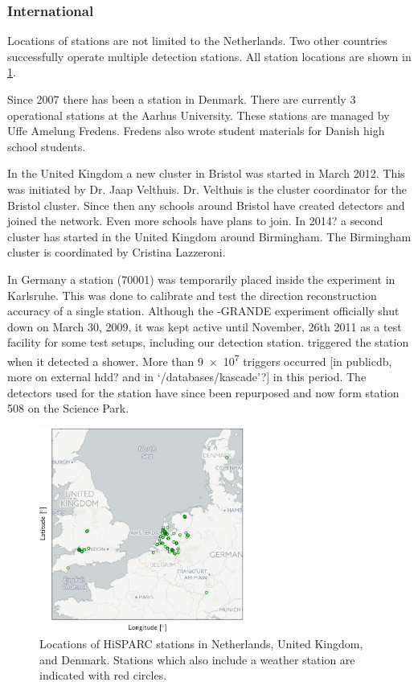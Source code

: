 \subsubsection{International}

Locations of \hisparc stations are not limited to the Netherlands. Two other countries successfully operate multiple detection stations. All station locations are shown in \cref{fig:network}.

Since 2007 there has been a \hisparc station in Denmark. There are currently 3 operational stations at the Aarhus University. These stations are managed by Uffe Amelung Fredens. Fredens also wrote student materials for Danish high school students.

In the United Kingdom a new cluster in Bristol was started in March 2012. This was initiated by Dr. Jaap Velthuis. Dr. Velthuis is the cluster coordinator for the Bristol cluster. Since then any schools around Bristol have created detectors and joined the network. Even more schools have plans to join. In 2014? a second cluster has started in the United Kingdom around Birmingham. The Birmingham cluster is coordinated by Cristina Lazzeroni.

In Germany a station (70001) was temporarily placed inside the \kascade experiment in Karlsruhe. This was done to calibrate and test the direction reconstruction accuracy of a single \hisparc station. Although the \kascade-GRANDE experiment officially shut down on March 30, 2009, it was kept active until November, 26th 2011 as a test facility for some test setups, including our detection station. \kascade triggered the \hisparc station when it detected a shower. More than \num{9e7} triggers occurred [in publicdb, more on external hdd? and in `/databases/kascade'?] in this period. The detectors used for the \kascade station have since been repurposed and now form station 508 on the Science Park.

\begin{figure}
    \centering
    \includegraphics[width=0.6\textwidth]
                    {plots/experiment/network}
    \caption{Locations of HiSPARC stations in Netherlands, United Kingdom, and Denmark. Stations which also include a weather station are indicated with red circles.}
    \label{fig:network}
\end{figure}

